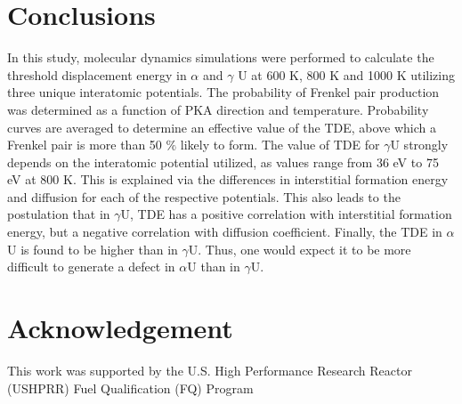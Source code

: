 \documentclass[review]{elsarticle}
\begin{document}
\FloatBarrier

\section{Conclusions}

In this study, molecular dynamics simulations were performed to calculate the threshold displacement energy in $\alpha$ and $\gamma$ U at 600 K, 800 K and 1000 K utilizing three unique interatomic potentials. The probability of Frenkel pair production was determined as a function of PKA direction and temperature. Probability curves are averaged to determine an effective value of the TDE, above which a Frenkel pair is more than 50 $\%$ likely to form. The value of TDE for $\gamma$U strongly depends on the interatomic potential utilized, as values range from 36 eV to 75 eV at 800 K. This is explained via the differences in interstitial formation energy and diffusion for each of the respective potentials. This also leads to the postulation that in $\gamma$U, TDE has a positive correlation with interstitial formation energy, but a negative correlation with diffusion coefficient. Finally, the TDE in $\alpha$U is found to be higher than in $\gamma$U. Thus, one would expect it to be more difficult to generate a defect in $\alpha$U than in $\gamma$U.


\section{Acknowledgement}
This work was supported by the U.S. High Performance Research Reactor (USHPRR) Fuel Qualification (FQ) Program 




\end{document}
